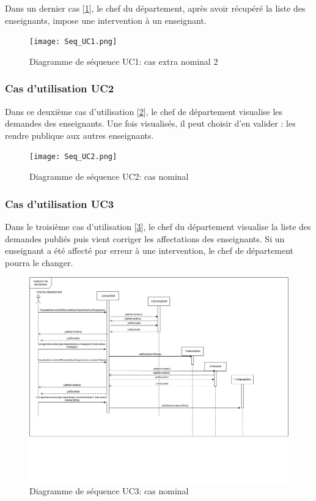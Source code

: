 \documentclass[a4paper,11pt]{article}
\begin{document}
Dans un dernier cas [\ref{DUC1__}], le chef du département, après avoir récupéré la liste des enseignants, impose une intervention à un enseignant.
\begin{figure}
\centering
\texttt{[image: Seq\_UC1.png]}
\caption{Diagramme de séquence UC1: cas extra nominal 2}
\label{DUC1__}
\end{figure}

\subsubsection{Cas d’utilisation UC2}
Dans ce deuxième cas d'utilisation [\ref{DUC2}], le chef de département visualise les demandes des enseignants. Une fois visualisés, il peut choisir d'en valider : les rendre publique aux autres enseignants.
\begin{figure}
\centering
\texttt{[image: Seq\_UC2.png]}
\caption{Diagramme de séquence UC2: cas nominal}
\label{DUC2}
\end{figure}
\subsubsection{Cas d’utilisation UC3}
Dans le troisième cas d'utilisation [\ref{DUC3}], le chef du département visualise la liste des demandes publiés puis vient corriger les affectations des enseignants. Si un enseignant a été affecté par erreur à une intervention, le chef de département pourra le changer.
\begin{figure}
\centering
\includegraphics[scale=0.4]{Seq_UC3.png}
\caption{Diagramme de séquence UC3: cas nominal}
\label{DUC3}
\end{figure}
\end{document}

